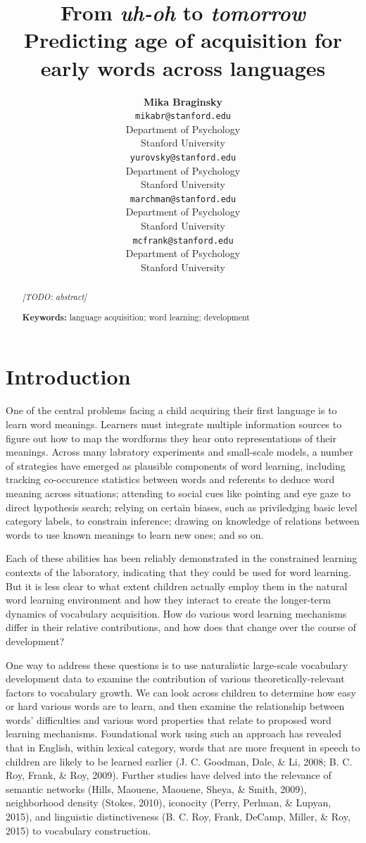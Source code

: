 \documentclass[10pt, letterpaper]{article}
\title{From \emph{uh-oh} to \emph{tomorrow}\\Predicting age of acquisition for
early words across languages}
\author{{\large \bf Mika Braginsky} \\ \texttt{mikabr@stanford.edu} \\ Department of Psychology \\ Stanford University \And {\large \bf Daniel Yurovsky} \\ \texttt{yurovsky@stanford.edu} \\ Department of Psychology \\ Stanford University \And {\large \bf Virginia A. Marchman} \\ \texttt{marchman@stanford.edu} \\ Department of Psychology \\ Stanford University \And {\large \bf Michael C. Frank} \\ \texttt{mcfrank@stanford.edu} \\ Department of Psychology \\ Stanford University}
\begin{document}
\maketitle

\begin{abstract}
\emph{{[}TODO: abstract{]}}

\textbf{Keywords:}
language acquisition; word learning; development
\end{abstract}

\section{Introduction}\label{introduction}

One of the central problems facing a child acquiring their first
language is to learn word meanings. Learners must integrate multiple
information sources to figure out how to map the wordforms they hear
onto representations of their meanings. Across many labratory
experiments and small-scale models, a number of strategies have emerged
as plausible components of word learning, including tracking
co-occurence statistics between words and referents to deduce word
meaning across situations; attending to social cues like pointing and
eye gaze to direct hypothesis search; relying on certain biases, such as
priviledging basic level category labels, to constrain inference;
drawing on knowledge of relations between words to use known meanings to
learn new ones; and so on.

Each of these abilities has been reliably demonstrated in the
constrained learning contexts of the laboratory, indicating that they
could be used for word learning. But it is less clear to what extent
children actually employ them in the natural word learning environment
and how they interact to create the longer-term dynamics of vocabulary
acquisition. How do various word learning mechanisms differ in their
relative contributions, and how does that change over the course of
development?

One way to address these questions is to use naturalistic large-scale
vocabulary development data to examine the contribution of various
theoretically-relevant factors to vocabulary growth. We can look across
children to determine how easy or hard various words are to learn, and
then examine the relationship between words' difficulties and various
word properties that relate to proposed word learning mechanisms.
Foundational work using such an approach has revealed that in English,
within lexical category, words that are more frequent in speech to
children are likely to be learned earlier (J. C. Goodman, Dale, \& Li,
2008; B. C. Roy, Frank, \& Roy, 2009). Further studies have delved into
the relevance of semantic networks (Hills, Maouene, Maouene, Sheya, \&
Smith, 2009), neighborhood density (Stokes, 2010), iconocity (Perry,
Perlman, \& Lupyan, 2015), and linguistic distinctiveness (B. C. Roy,
Frank, DeCamp, Miller, \& Roy, 2015) to vocabulary construction.
\end{document}
